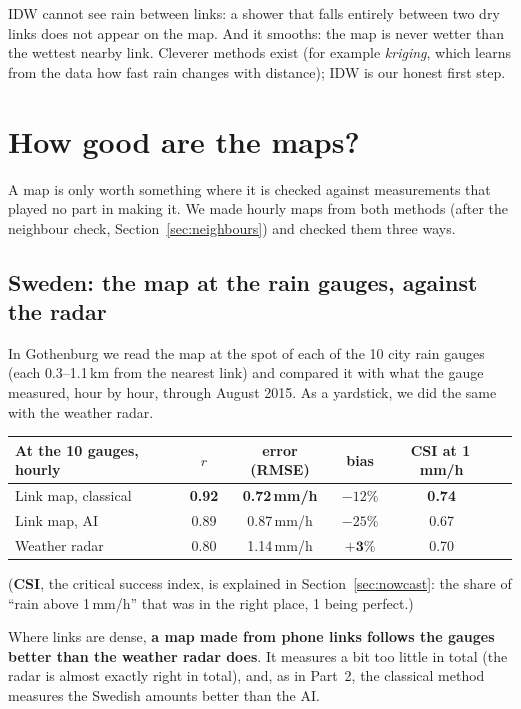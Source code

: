\begin{careful}
IDW cannot see rain between links: a shower that falls entirely between two dry links does not appear on the map.
And it smooths: the map is never wetter than the wettest nearby link. Cleverer methods exist (for example
\emph{kriging}, which learns from the data how fast rain changes with distance); IDW is our honest first step.
\end{careful}

\section{How good are the maps?}
\label{sec:map_scores}

A map is only worth something where it is checked against measurements that played no part in making it. We made hourly
maps from both methods (after the neighbour check, Section~\ref{sec:neighbours}) and checked them three ways.

\subsection{Sweden: the map at the rain gauges, against the radar}
In Gothenburg we read the map at the spot of each of the 10 city rain gauges (each 0.3--1.1\,km from the nearest link)
and compared it with what the gauge measured, hour by hour, through August 2015. As a yardstick, we did the same with the
weather radar.
\begin{center}\small
\begin{tabular}{lccccc}
\toprule
At the 10 gauges, hourly & $r$ & error (RMSE) & bias & CSI at 1\,mm/h\\
\midrule
Link map, classical & \textbf{0.92} & \textbf{0.72\,mm/h} & $-12\%$ & \textbf{0.74}\\
Link map, AI & 0.89 & 0.87\,mm/h & $-25\%$ & 0.67\\
Weather radar & 0.80 & 1.14\,mm/h & $\mathbf{+3\%}$ & 0.70\\
\bottomrule
\end{tabular}
\end{center}
(\textbf{CSI}, the critical success index, is explained in Section~\ref{sec:nowcast}: the share of ``rain above 1\,mm/h'' that
was in the right place, 1 being perfect.)

Where links are dense, \textbf{a map made from phone links follows the gauges better than the weather radar does}. It
measures a bit too little in total (the radar is almost exactly right in total), and, as in Part~2, the classical method
measures the Swedish amounts better than the AI.

